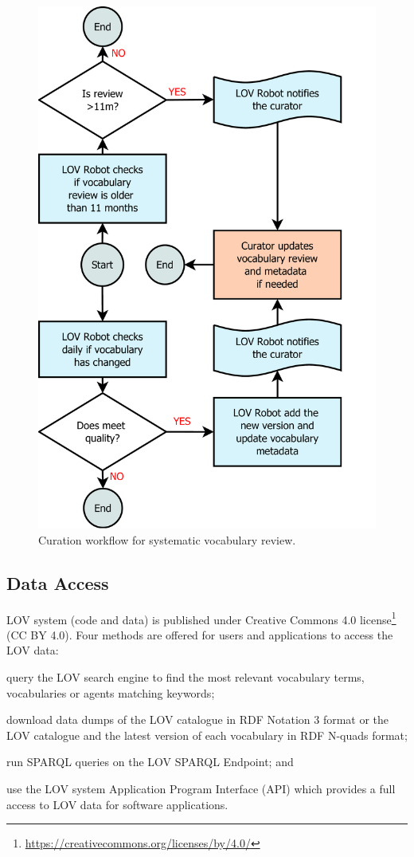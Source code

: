 \documentclass{iosart2c}
\begin{document}
\begin{figure}[ht!b]
\includegraphics[width=1\textwidth]{FlowCharts/DiagramCuration.pdf}
\caption{Curation workflow for systematic vocabulary review.}
\label{fig:reviewWorkflow}
\end{figure}

\subsection{Data Access}

LOV system (code and data) is published under Creative Commons 4.0 license\footnote{\url{https://creativecommons.org/licenses/by/4.0/}} (CC BY 4.0). Four methods are offered for users and applications to access the LOV data:
		\begin{inparaenum}[1)] 
			\item query the LOV search engine to find the most relevant vocabulary terms, vocabularies or agents matching keywords;
			\item download data dumps of the LOV catalogue in RDF Notation 3 format or the LOV catalogue and the latest version of each vocabulary in RDF N-quads format;
			\item run SPARQL queries on the LOV SPARQL Endpoint; and
			\item use the LOV system Application Program Interface (API) which provides a full access to LOV data for software applications.
		\end{inparaenum}
\end{document}
